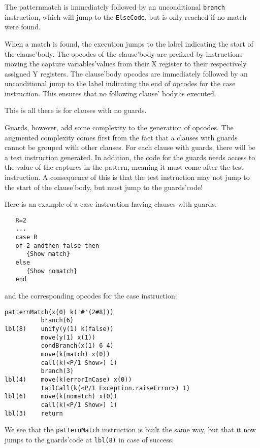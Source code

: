 \documentclass[a4paper]{memoir}
\begin{document}
The patternmatch is immediately followed by an unconditional \lstinline!branch! instruction,
which will jump to the \lstinline!ElseCode!, but is only reached if no match were found.

When a match is found, the execution jumps to the label indicating the start of the clause'body.
The opcodes of the clause'body are prefixed by instructions moving the capture
variables'values from their X register to their respectively assigned Y
registers.
The clause'body opcodes are immediately followed by an unconditional jump to
the label indicating the end of opcodes for the case instruction. This ensures
that no following clause' body is executed.

This is all there is for clauses with no guards. 

Guards, however, add some complexity to the generation of opcodes.
The augmented complexity comes first from the fact that a clauses with guards cannot
be grouped with other clauses. For each clause with guards, there will be a
test instruction generated. In addition, the code for the guards needs access
to the value of the captures in the pattern, meaning it must come after the
test instruction. A consequence of this is that the test instruction may not jump to the start
of the clause'body, but must jump to the guards'code!

Here is an example of a case instruction having clauses with guards:
\begin{lstlisting}
   R=2
   ...
   case R
   of 2 andthen false then
      {Show match}
   else
      {Show nomatch}
   end
\end{lstlisting}

and the corresponding opcodes for the case instruction:

\lstset{numbers=left, numberstyle=\tiny, stepnumber=1, numbersep=5pt}
\begin{lstlisting}[firstnumber=1]
          patternMatch(x(0) k('#'(2#8)))
          branch(6)
lbl(8)    unify(y(1) k(false))
          move(y(1) x(1))
          condBranch(x(1) 6 4)
          move(k(match) x(0))
          call(k(<P/1 Show>) 1)
          branch(3)
lbl(4)    move(k(errorInCase) x(0))
          tailCall(k(<P/1 Exception.raiseError>) 1)
lbl(6)    move(k(nomatch) x(0))
          call(k(<P/1 Show>) 1)
lbl(3)    return
\end{lstlisting}
\lstset{numbers=none}
We see that the \lstinline!patternMatch! instruction is built the same way, but
that it now jumps to the guards'code at \lstinline!lbl(8)! in case of
success. 
\end{document}
